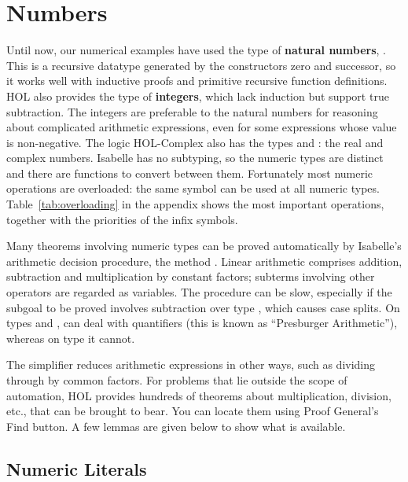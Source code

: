 
\section{Numbers}
\label{sec:numbers}

%
Until now, our numerical examples have used the type of \textbf{natural
numbers},
.  This is a recursive datatype generated by the constructors
zero  and successor, so it works well with inductive proofs and primitive
recursive function definitions.  HOL also provides the type
 of \textbf{integers}, which lack induction but support true
subtraction.  The integers are preferable to the natural numbers for reasoning about
complicated arithmetic expressions, even for some expressions whose
value is non-negative.  The logic HOL-Complex also has the types
 and : the real and complex numbers.  Isabelle has no 
subtyping,  so the numeric
types are distinct and there are functions to convert between them.
Fortunately most numeric operations are overloaded: the same symbol can be
used at all numeric types. Table~\ref{tab:overloading} in the appendix
shows the most important operations, together with the priorities of the
infix symbols.

%
Many theorems involving numeric types can be proved automatically by
Isabelle's arithmetic decision procedure, the method
.  Linear arithmetic comprises addition, subtraction
and multiplication by constant factors; subterms involving other operators
are regarded as variables.  The procedure can be slow, especially if the
subgoal to be proved involves subtraction over type , which 
causes case splits.  On types  and , 
can deal with quantifiers (this is known as ``Presburger Arithmetic''),
whereas on type  it cannot.

The simplifier reduces arithmetic expressions in other
ways, such as dividing through by common factors.  For problems that lie
outside the scope of automation, HOL provides hundreds of
theorems about multiplication, division, etc., that can be brought to
bear.  You can locate them using Proof General's Find
button.  A few lemmas are given below to show what
is available.

\subsection{Numeric Literals}
\label{sec:numerals}

